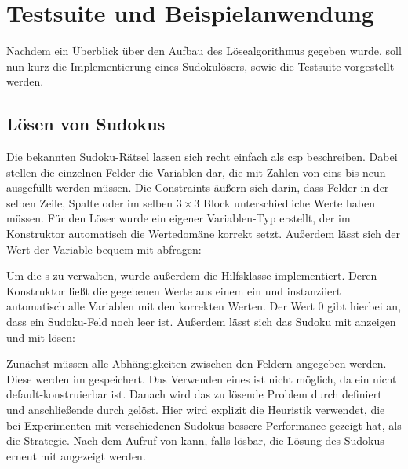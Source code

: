 \section{Testsuite und Beispielanwendung}
Nachdem ein Überblick über den Aufbau des Lösealgorithmus gegeben wurde, soll nun kurz die Implementierung eines Sudokulösers, sowie die Testsuite vorgestellt werden.

\subsection{Lösen von Sudokus}
Die bekannten Sudoku-Rätsel lassen sich recht einfach als \ac*{csp} beschreiben. Dabei stellen die einzelnen Felder die Variablen dar, die mit Zahlen von eins bis neun ausgefüllt
werden müssen. Die Constraints äußern sich darin, dass Felder in der selben Zeile, Spalte oder im selben $3 \times 3$ Block unterschiedliche Werte haben müssen. Für den Löser wurde
ein eigener Variablen-Typ erstellt, der im Konstruktor automatisch die Wertedomäne korrekt setzt. Außerdem lässt sich der Wert der Variable bequem mit  abfragen:

Um die s zu verwalten, wurde außerdem die Hilfsklasse  implementiert. Deren Konstruktor ließt die gegebenen Werte aus einem 
ein und instanziiert automatisch alle Variablen mit den korrekten Werten. Der Wert 0 gibt hierbei an, dass ein Sudoku-Feld noch leer ist. Außerdem lässt sich das Sudoku mit
 anzeigen und mit  lösen:

Zunächst müssen alle Abhängigkeiten zwischen den Feldern angegeben werden. Diese werden im  gespeichert. Das Verwenden eines  ist
nicht möglich, da ein  nicht default-konstruierbar ist. Danach wird das zu lösende Problem durch  definiert und anschließende durch
 gelöst. Hier wird explizit die Heuristik  verwendet, die bei Experimenten mit verschiedenen Sudokus bessere Performance gezeigt
hat, als die  Strategie. Nach dem Aufruf von  kann, falls lösbar, die Lösung des Sudokus erneut mit  angezeigt werden.

